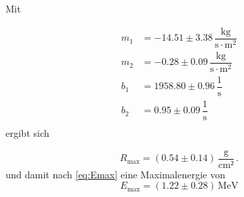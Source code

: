 Mit

\begin{align*}
    m_1 &= -14.51  \pm 3.38\,  \dfrac{\unit{\kilo\gram}}{\unit{\second \cdot \meter^2}}\\
    m_2 &= -0.28   \pm 0.09\,  \dfrac{\unit{\kilo\gram}}{\unit{\second \cdot \meter^2}}  \\
    b_1 &= 1958.80 \pm 0.96\,  \dfrac{1}{\unit{\second}}                         \\
    b_2 &= 0.95    \pm 0.09\,  \dfrac{1}{\unit{\second}}                          \\
\end{align*} ergibt sich

\begin{equation*}
    R_\text{max} = \left( 0.54 \pm 0.14 \right) \, \dfrac{\unit{\gram}}{\unit{\cm²}} \,.
\end{equation*}
und damit nach \eqref{eq:Emax} eine Maximalenergie von
\begin{equation*}
    E_\text{max} = \left(1.22 \pm 0.28 \right) \, \unit{\mega\eV}
\end{equation*}


